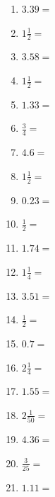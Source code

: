 \documentclass[12pt]{article}
\begin{document}
\begin{enumerate}
\item \large $ 3.39 = $ \vspace{1.5cm}
\newpage
\item \large $ 1 \frac{1}{2} = $ \vspace{1.5cm}
\item \large $ 3.58 = $ \vspace{1.5cm}
\item \large $ 1 \frac{1}{2} = $ \vspace{1.5cm}
\item \large $ 1.33 = $ \vspace{1.5cm}
\item \large $ \frac{3}{4} = $ \vspace{1.5cm}
\item \large $ 4.6 = $ \vspace{1.5cm}
\item \large $ 1 \frac{1}{2} = $ \vspace{1.5cm}
\item \large $ 0.23 = $ \vspace{1.5cm}
\item \large $ \frac{1}{2} = $ \vspace{1.5cm}
\item \large $ 1.74 = $ \vspace{1.5cm}
\newpage
\item \large $ 1 \frac{1}{4} = $ \vspace{1.5cm}
\item \large $ 3.51 = $ \vspace{1.5cm}
\item \large $ \frac{1}{2} = $ \vspace{1.5cm}
\item \large $ 0.7 = $ \vspace{1.5cm}
\item \large $ 2 \frac{1}{4} = $ \vspace{1.5cm}
\item \large $ 1.55 = $ \vspace{1.5cm}
\item \large $ 2 \frac{1}{50} = $ \vspace{1.5cm}
\item \large $ 4.36 = $ \vspace{1.5cm}
\item \large $ \frac{3}{25} = $ \vspace{1.5cm}
\item \large $ 1.11 = $ \vspace{1.5cm}
\newpage

\end{enumerate}
\end{document}
